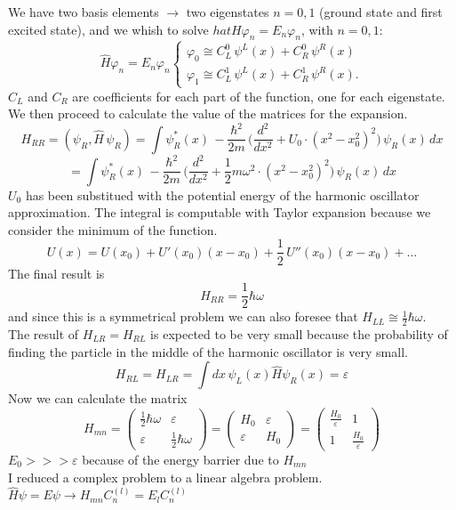 We have two basis elements $\rightarrow$ two eigenstates $n=0,1$ (ground state and first excited state), and we whish to solve $hat{H}\varphi_n=E_n\varphi_n$, with $n=0,1$:
\[
\hat{H}\varphi_n=E_n\varphi_n
\begin{cases}
\varphi_0 \cong C_L^0\,\psi^L(x)+C_R^0\,\psi^R(x)\\
\varphi_1 \cong C_L^1\,\psi^L(x)+C_R^1\,\psi^R(x).
\end{cases}
\]
$C_L$ and $C_R$ are coefficients for each part of the function, one for each eigenstate.\\
We then proceed to calculate the value of the matrices for the expansion.\\
\[
H_{RR}=(\psi_R,\hat{H}\,\psi_R)= \int\psi_R^*(x)\,-\frac{\hbar^2}{2m}\,\bigg(\frac{d^2}{dx^2}+U_0\cdot(x^2-x_0^2)^2\bigg)\,\psi_R(x)\,dx\]
\[
=\int\psi_R^*(x)\,-\frac{\hbar^2}{2m}\,\bigg  (\frac{d^2}{dx^2}+\frac{1}{2}m\omega^2\cdot(x^2-x_0^2)^2\bigg)\,\psi_R(x)\,dx
\]
$U_0$ has been substitued with the potential energy of the harmonic oscillator approximation. The integral is computable with Taylor expansion because we consider the minimum of the function.
\[
U(x)=U(x_0)+U'(x_0)(x-x_0)+\frac{1}{2}\,U''(x_0)(x-x_0)+\dots\]
The final result is
\[
H_{RR}=\frac{1}{2}\hbar\omega
\]
and since this is a symmetrical problem we can also foresee that $H_{LL}\cong\frac{1}{2}\hbar\omega$.\\
The result of $H_{LR}=H_{RL}$ is expected to be very small because the probability of finding the particle in the middle of the harmonic oscillator is very small.
\[
H_{RL}=H_{LR}=\int dx\,\psi_L(x)\hat{H}\psi_R(x) = \varepsilon
\]
Now we can calculate the matrix
\[
H_{mn}=
\begin{pmatrix}
\frac{1}{2}\hbar\omega & \varepsilon\\
\varepsilon & \frac{1}{2}\hbar\omega
\end{pmatrix}
=
\begin{pmatrix}
H_0 & \varepsilon\\
\varepsilon & H_0
\end{pmatrix}
=
\begin{pmatrix}
\frac{H_0}{\varepsilon} & 1\\
1 & \frac{H_0}{\varepsilon}
\end{pmatrix}
\]
$E_0>>>\varepsilon$ because of the energy barrier due to $H_{mn}$\\
I reduced a complex problem to a linear algebra problem.\\
$\hat{H}\psi=E\psi \rightarrow H_{mn}C_n^{(l)}=E_lC_n^{(l)}$\\
